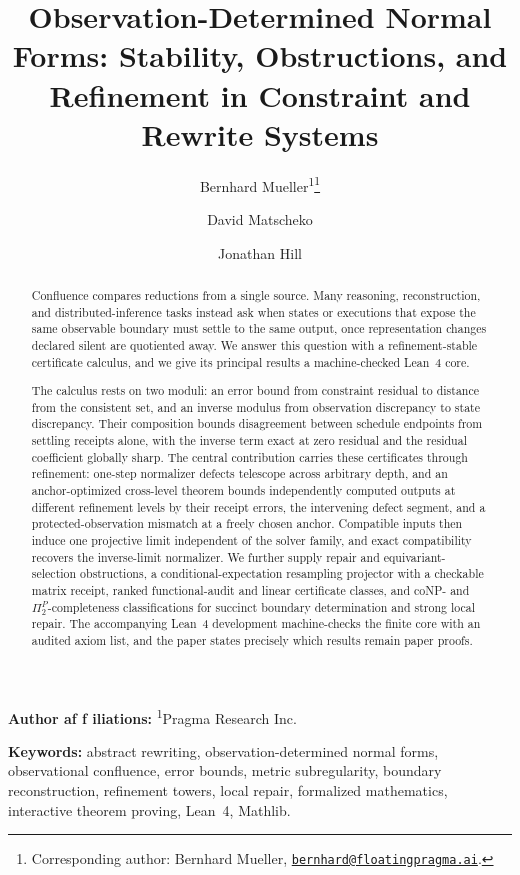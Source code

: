 \documentclass[11pt]{article}
\title{\textbf{Observation-Determined Normal Forms: Stability, Obstructions, and Refinement in Constraint and Rewrite Systems}}
\author{Bernhard Mueller\textsuperscript{1}\thanks{Corresponding author: Bernhard Mueller,
\href{mailto:bernhard@floatingpragma.ai}{\texttt{bernhard@floatingpragma.ai}}.}
\and David Matscheko \and Jonathan Hill}
\date{\PaperReleaseDate}
\theoremstyle{definition}
\theoremstyle{remark}
\numberwithin{equation}{section}
\begin{document}
\maketitle
\PaperReleaseBanner

\begin{center}
\small\textbf{Author af\kern0pt f\kern0pt iliations:} \textsuperscript{1}Pragma Research Inc.
\end{center}

\begin{abstract}
Confluence compares reductions from a single source.  Many reasoning, reconstruction, and distributed-inference tasks instead ask when states or executions that expose the same observable boundary must settle to the same output, once representation changes declared silent are quotiented away.  We answer this question with a refinement-stable certificate calculus, and we give its principal results a machine-checked Lean~4 core.

The calculus rests on two moduli: an error bound from constraint residual to distance from the consistent set, and an inverse modulus from observation discrepancy to state discrepancy.  Their composition bounds disagreement between schedule endpoints from settling receipts alone, with the inverse term exact at zero residual and the residual coefficient globally sharp.  The central contribution carries these certificates through refinement: one-step normalizer defects telescope across arbitrary depth, and an anchor-optimized cross-level theorem bounds independently computed outputs at different refinement levels by their receipt errors, the intervening defect segment, and a protected-observation mismatch at a freely chosen anchor.  Compatible inputs then induce one projective limit independent of the solver family, and exact compatibility recovers the inverse-limit normalizer.  We further supply repair and equivariant-selection obstructions, a conditional-expectation resampling projector with a checkable matrix receipt, ranked functional-audit and linear certificate classes, and coNP- and $\Pi_2^P$-completeness classifications for succinct boundary determination and strong local repair.  The accompanying Lean~4 development machine-checks the finite core with an audited axiom list, and the paper states precisely which results remain paper proofs.
\end{abstract}

\medskip
\noindent\textbf{Keywords:} abstract rewriting, observation-determined normal forms, observational confluence, error bounds, metric subregularity, boundary reconstruction, refinement towers, local repair, formalized mathematics, interactive theorem proving, Lean~4, Mathlib.
\end{document}
